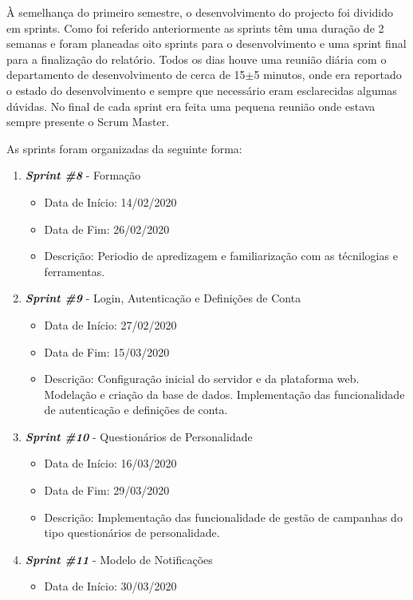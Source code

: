À semelhança do primeiro semestre, o desenvolvimento do projecto foi dividido em sprints. Como foi referido anteriormente as sprints têm uma duração de 2 semanas e foram planeadas oito sprints para o desenvolvimento e uma sprint final para a finalização do relatório. Todos os dias houve uma reunião diária com o departamento de desenvolvimento de cerca de 15$\pm$5 minutos, onde era reportado o estado do desenvolvimento e sempre que necessário eram esclarecidas algumas dúvidas. No final de cada sprint era feita uma pequena reunião onde estava sempre presente o Scrum Master.

As sprints foram organizadas da seguinte forma:

\begin{enumerate}
	\item \textit{\textbf{Sprint \#8}} - Formação
	\begin{itemize}
		\item Data de Início: 14/02/2020
		\item Data de Fim: 26/02/2020
		\item Descrição: Periodio de apredizagem e familiarização com as técnilogias e ferramentas.
	\end{itemize}
	\item \textit{\textbf{Sprint \#9}} - Login, Autenticação e Definições de Conta
	\begin{itemize}
		\item Data de Início: 27/02/2020
		\item Data de Fim: 15/03/2020
		\item Descrição: Configuração inicial do servidor e da plataforma web. Modelação e criação da base de dados. Implementação das funcionalidade de autenticação e definições de conta.
	\end{itemize}
	\item \textit{\textbf{Sprint \#10}} - Questionários de Personalidade
	\begin{itemize}
		\item Data de Início: 16/03/2020
		\item Data de Fim: 29/03/2020
		\item Descrição: Implementação das funcionalidade de gestão de campanhas do tipo questionários de personalidade. 
	\end{itemize}
	\item \textit{\textbf{Sprint \#11}} - Modelo de Notificações
	\begin{itemize}
		\item Data de Início: 30/03/2020

\end{itemize}
\end{enumerate}
